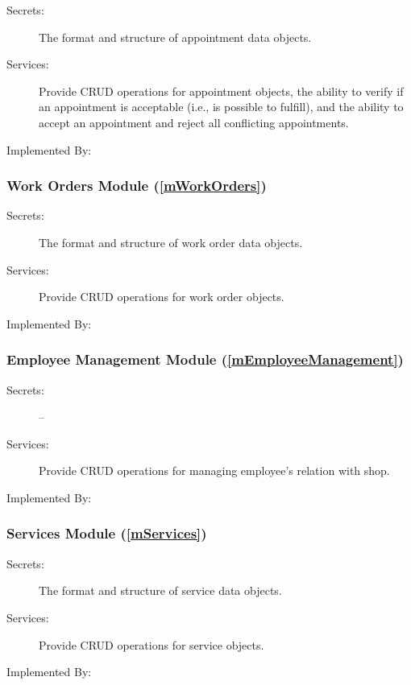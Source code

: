 \documentclass[12pt, titlepage]{article}
\begin{document}
\begin{description}
	\item[Secrets:] The format and structure of appointment data objects.
	\item[Services:] Provide CRUD operations for appointment objects, the ability to verify if an appointment
		is acceptable (i.e., is possible to fulfill), and the ability to accept an appointment and reject
		all conflicting appointments.
	\item[Implemented By:] \progname{}
\end{description}

\subsubsection{Work Orders Module (\ref{mWorkOrders})}

\begin{description}
	\item[Secrets:] The format and structure of work order data objects.
	\item[Services:] Provide CRUD operations for work order objects.
	\item[Implemented By:] \progname{}
\end{description}

\subsubsection{Employee Management Module (\ref{mEmployeeManagement})}

\begin{description}
	\item[Secrets:] --
	\item[Services:] Provide CRUD operations for managing employee's relation with shop.
	\item[Implemented By:] \progname{}
\end{description}

\subsubsection{Services Module (\ref{mServices})}

\begin{description}
	\item[Secrets:] The format and structure of service data objects.
	\item[Services:] Provide CRUD operations for service objects.
	\item[Implemented By:] \progname{}
\end{description}
\end{document}
